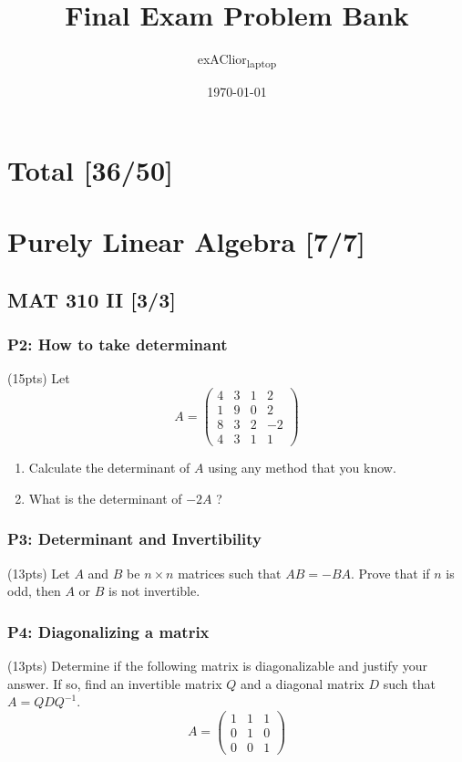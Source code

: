 \documentclass[11pt]{article}
\author{exAClior\textsubscript{laptop}}
\date{\today}
\title{Final Exam Problem Bank}
\begin{document}
\maketitle
\tableofcontents

\section{Total [36/50]}
\label{sec:orgc4ae1e8}

\section{Purely Linear Algebra [7/7]}
\label{sec:org9fb2c50}
\subsection{MAT 310 II [3/3]}
\label{sec:org5cc0bb7}
\subsubsection{P2: How to take determinant}
\label{sec:orga098377}
(15pts) Let \[ A=\left(\begin{array}{cccc} 4 & 3 & 1 & 2 \\ 1 & 9 & 0 & 2 \\ 8 &
3 & 2 & -2 \\ 4 & 3 & 1 & 1 \end{array}\right) \]
\begin{enumerate}
\item Calculate the determinant of \(A\) using any method that you know.
\item What is the determinant of \(-2 A\) ?
\end{enumerate}
\subsubsection{P3: Determinant and Invertibility}
\label{sec:org2fcc553}
(13pts) Let \(A\) and \(B\) be \(n \times n\) matrices such that \(A B=-B A\).
Prove that if \(n\) is odd, then \(A\) or \(B\) is not invertible.
\subsubsection{P4: Diagonalizing a matrix}
\label{sec:org5527edf}
(13pts) Determine if the following matrix is diagonalizable and justify your
answer. If so, find an invertible matrix \(Q\) and a diagonal matrix \(D\) such
that \(A=Q D Q^{-1}\).
\[ A=\left(\begin{array}{lll} 1 & 1 & 1 \\ 0 & 1 & 0 \\ 0
& 0 & 1 \end{array}\right) \]
\end{document}
